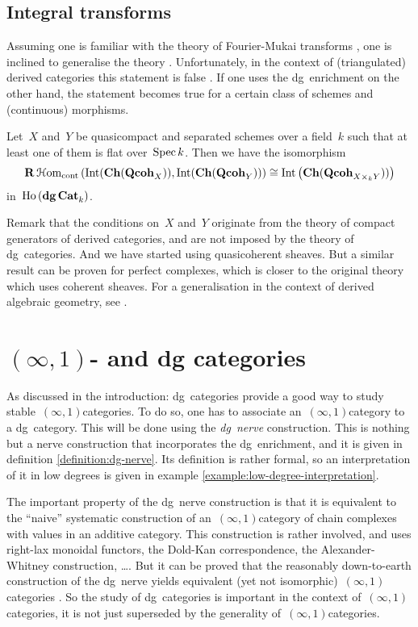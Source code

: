 \begin{refsection}
\subsection{Integral transforms}
Assuming one is familiar with the theory of Fourier-Mukai transforms \cite{huybrechts}, one is inclined to generalise the theory \cite[conjecture 6.4]{caldararu}. Unfortunately, in the context of (triangulated) derived categories this statement is false \cite[example 6.5]{caldararu}. If one uses the dg~enrichment on the other hand, the statement becomes true for a certain class of schemes and (continuous) morphisms.
\begin{theorem}
  \label{theorem:integral-transforms}
  Let~$X$ and~$Y$ be quasicompact and separated schemes over a field~$k$ such that at least one of them is flat over~$\operatorname{Spec} k$. Then we have the isomorphism
  \begin{equation}
    \mathbf{R}\operatorname{\mathcal{H}om}_{\mathrm{cont}}\left( \operatorname{Int}(\mathbf{Ch}(\mathbf{Qcoh}_X)),\operatorname{Int}(\mathbf{Ch}(\mathbf{Qcoh}_Y)) \right)\cong\operatorname{Int}\left( \mathbf{Ch}(\mathbf{Qcoh}_{X\times_kY})) \right)
  \end{equation}
  in~$\operatorname{\mathrm{Ho} \,}(\mathbf{dg\,Cat}_k)$.
\end{theorem}
Remark that the conditions on~$X$ and~$Y$ originate from the theory of compact generators of derived categories, and are not imposed by the theory of dg~categories. And we have started using quasicoherent sheaves. But a similar result can be proven for perfect complexes, which is closer to the original theory which uses coherent sheaves. For a generalisation in the context of derived algebraic geometry, see \cite{ben-zvi}.


\section{\texorpdfstring{$(\infty,1)$-}{(oo,1)-} and dg categories}
As discussed in the introduction: dg~categories provide a good way to study stable~$(\infty,1)$\dash categories. To do so, one has to associate an~$(\infty,1)$\dash category to a dg~category. This will be done using the \emph{dg~nerve} construction. This is nothing but a nerve construction that incorporates the dg~enrichment, and it is given in definition \ref{definition:dg-nerve}. Its definition is rather formal, so an interpretation of it in low degrees is given in example \ref{example:low-degree-interpretation}.

The important property of the dg~nerve construction is that it is equivalent to the ``naive'' systematic construction of an~$(\infty,1)$\dash category of chain complexes with values in an additive category. This construction is rather involved, and uses right-lax monoidal functors, the Dold-Kan correspondence, the Alexander-Whitney construction, \ldots. But it can be proved that the reasonably down-to-earth construction of the dg~nerve yields equivalent (yet not isomorphic)~$(\infty,1)$\dash categories \cite[proposition 1.3.1.17]{ha}. So the study of dg~categories is important in the context of~$(\infty,1)$\dash categories, it is not just superseded by the generality of~$(\infty,1)$\dash categories.


\end{refsection}
